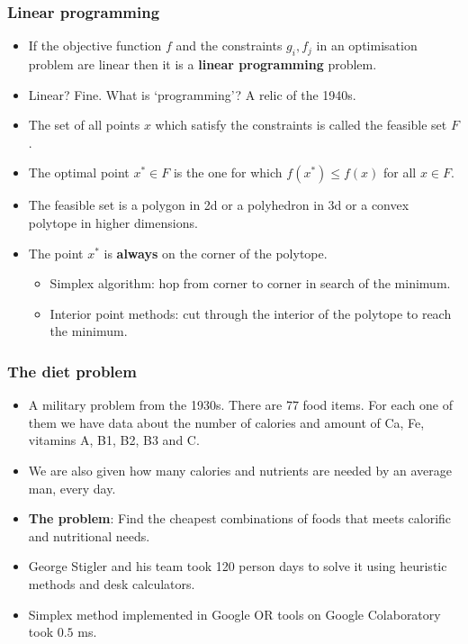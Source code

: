 \documentclass{beamer}
\begin{document}
\begin{frame}
\frametitle{Linear programming}
\begin{itemize}
\item If the objective function $f$ and the constraints $g_i, f_j$ in an
optimisation problem are linear then it is a \textbf{linear programming}
problem.
\item Linear? Fine. What is `programming'? A relic of the 1940s.
\item The set of all points $x$ which satisfy the constraints is called the
feasible set $F$.
\item The optimal point $x^\ast \in F$ is the one for which $f(x^\ast) \le
f(x)$ for all $x \in F$.
\item The feasible set is a polygon in 2d or a polyhedron in 3d or a convex
polytope in higher dimensions.
\item The point $x^\ast$ is \textbf{always} on the corner of the polytope.
\begin{itemize}
\item Simplex algorithm: hop from corner to corner in search of the minimum.
\item Interior point methods: cut through the interior of the polytope to
reach the minimum.
\end{itemize}
\end{itemize}
\end{frame}

\begin{frame}
\frametitle{The diet problem}
\begin{itemize}
\item A military problem from the 1930s. There are $77$ food items. For each
one of them we have data about the number of calories and amount of Ca, Fe,
vitamins A, B1, B2, B3 and C. 
\item We are also given how many calories and nutrients are needed by an
average man, every day.
\item \textbf{The problem}: Find the cheapest combinations of foods that meets
calorific and nutritional needs.
\item George Stigler and his team took 120 person days to solve it using
heuristic methods and desk calculators.
\item Simplex method implemented in Google OR tools on Google Colaboratory
took $0.5$ ms.
\end{itemize}
\end{frame}
\end{document}
